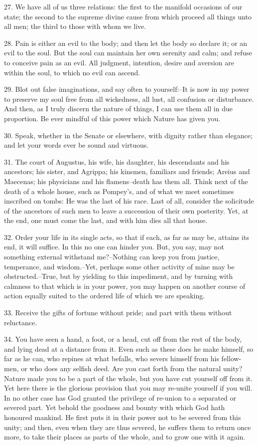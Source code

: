 \documentclass{book}
\begin{document}
27. We have all of us three relations: the first to the manifold
occasions of our state; the second to the supreme divine cause from
which proceed all things unto all men; the third to those with whom we
live.

28. Pain is either an evil to the body; and then let the body so
declare it; or an evil to the soul. But the soul can maintain her own
serenity and calm; and refuse to conceive pain as an evil. All
judgment, intention, desire and aversion are within the soul, to which
no evil can ascend.

29. Blot out false imaginations, and say often to yourself:--It is
now in my power to preserve my soul free from all wickedness, all
lust, all confusion or disturbance. And then, as I truly discern the
nature of things, I can use them all in due proportion. Be ever
mindful of this power which Nature has given you.

30. Speak, whether in the Senate or elsewhere, with dignity rather
than elegance; and let your words ever be sound and virtuous.

31. The court of Augustus, his wife, his daughter, his descendants and
his ancestors; his sister, and Agrippa; his kinsmen, familiars and
friends; Areius and Maecenas; his physicians and his flamens--death
has them all. Think next of the death of a whole house, such as
Pompey's, and of what we meet sometimes inscribed on tombs: He was the
last of his race. Last of all, consider the solicitude of the
ancestors of such men to leave a succession of their own
posterity. Yet, at the end, one must come the last, and with him dies
all that house.

32. Order your life in its single acts, so that if each, as far as may
be, attains its end, it will suffice. In this no one can hinder
you. But, you say, may not something external withstand me?--Nothing
can keep you from justice, temperance, and wisdom.--Yet, perhaps
some other activity of mine may be obstructed.--True, but by
yielding to this impediment, and by turning with calmness to that
which is in your power, you may happen on another course of action
equally suited to the ordered life of which we are speaking.

33. Receive the gifts of fortune without pride; and part with them
without reluctance.

34. You have seen a hand, a foot, or a head, cut off from the rest of
the body, and lying dead at a distance from it. Even such as these
does he make himself, so far as he can, who repines at what befalls,
who severs himself from his fellow-men, or who does any selfish
deed. Are you cast forth from the natural unity? Nature made you to be
a part of the whole, but you have cut yourself off from it. Yet here
there is the glorious provision that you may re-unite yourself if you
will. In no other case has God granted the privilege of re-union to a
separated or severed part. Yet behold the goodness and bounty with
which God hath honoured mankind. He first puts it in their power not
to be severed from this unity; and then, even when they are thus
severed, he suffers them to return once more, to take their places as
parts of the whole, and to grow one with it again.
\end{document}

